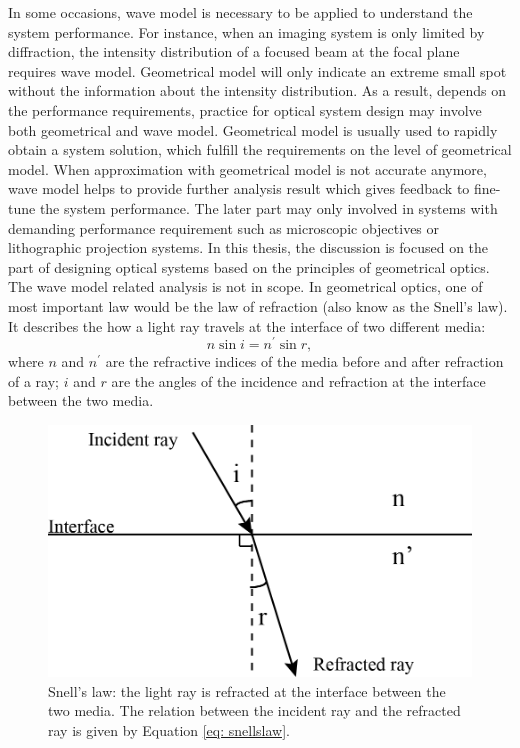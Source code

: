 In some occasions, wave model is necessary to be applied to understand the system performance. For instance, when an imaging system is only limited by diffraction, the intensity distribution of a focused beam at the focal plane requires wave model. Geometrical model will only indicate an extreme small spot without the information about the intensity distribution. As a result, depends on the performance requirements, practice for optical system design may involve both geometrical and wave model. Geometrical model is usually used to rapidly obtain a system solution, which fulfill the requirements on the level of geometrical model. When approximation with geometrical model is not accurate anymore, wave model helps to provide further analysis result which gives feedback to fine-tune the system performance. The later part may only involved in systems with demanding performance requirement such as microscopic objectives or lithographic projection systems. In this thesis, the discussion is focused on the part of designing optical systems based on the principles of geometrical optics. The wave model related analysis is not in scope.  
%
In geometrical optics, one of most important law would be the law of refraction (also know as the Snell's law). It describes the how a light ray travels at the interface of two different media:
\begin{equation}
n \sin i = n^\prime \sin r,
\label{eq: snellslaw}
\end{equation}where $n$ and $n^\prime$ are the refractive indices of the media before and after refraction of a ray; $i$ and $r$ are the angles of the incidence and refraction at the interface between the two media.
\begin{figure}
    \centering
    \includegraphics[scale=0.58]{chapter-1/figures/snellslaw.png}
    \caption{Snell's law: the light ray is refracted at the interface between the two media. The relation between the incident ray and the refracted ray is given by Equation \ref{eq: snellslaw}.}
    \label{fig: snellslaw}
\end{figure} 


